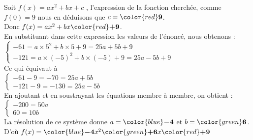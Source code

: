 \documentclass[a4paper,11pt,exos]{nsi} %
\begin{document}
Soit $f(x)=ax^2+bx+c$ , l'expression de la fonction cherchée, comme $f(0)=9$ nous en déduisons que $c={\color{red}\boldsymbol{9}}$.\\Donc $f(x)=ax^2+bx{\color{red}\boldsymbol{+9}}$.\\En substituant dans cette expression les valeurs de l'énoncé, nous obtenons :\\$\begin{cases}
    -61=a\times5^2+b\times5+9=25a +5b +9 \\
    -121=a\times(-5)^2+b\times(-5)+9=25a -5b +9
     \end{cases}$\\Ce qui équivaut à \\$\begin{cases}
     -61-9=-70=25a +5b \\
     -121-9=-130=25a -5b
       \end{cases}$\\En ajoutant et en soustrayant les équations membre à membre, on obtient :\\
    $\begin{cases}
    -200=50a \\
    60=10b
     \end{cases}$\\La résolution de ce système donne $a={\color{blue}\boldsymbol{-4}}$ et $b={\color{green}\boldsymbol{6}}$.\\D'où $f(x)={\color{blue}\boldsymbol{-4}}x^2 {\color{green}\boldsymbol{+6}}x  {\color{red}\boldsymbol{+9}}$\\
    
\end{document}
